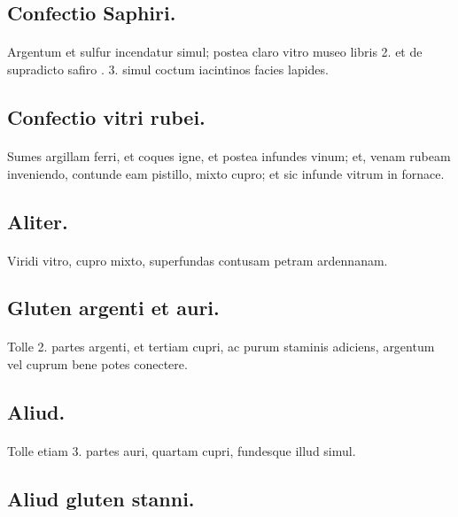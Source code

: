 \documentclass[a4paper, 11pt, oneside, polutonikogreek, italian]{article}
\begin{document}
\subsection{Confectio Saphiri.}
\paragraph{}
Argentum et sulfur incendatur simul; postea claro vitro museo libris 2. et de supradicto safiro \roundz. 3. simul coctum iacintinos facies lapides.

\subsection{Confectio vitri rubei.}
\paragraph{}
Sumes argillam ferri, et coques igne, et postea infundes vinum; et, venam rubeam inveniendo, contunde eam pistillo, mixto cupro; et sic infunde vitrum in fornace.

\subsection{Aliter.}
\paragraph{}
Viridi vitro, cupro mixto, superfundas contusam petram ardennanam.

\subsection{Gluten argenti et auri.}
\paragraph{}
Tolle 2. partes argenti, et tertiam cupri, ac purum staminis adiciens, argentum vel cuprum bene potes conectere.

\subsection{Aliud.}
\paragraph{}
Tolle etiam 3. partes auri, quartam cupri, fundesque illud simul.

\subsection{Aliud gluten stanni.}
\end{document}
